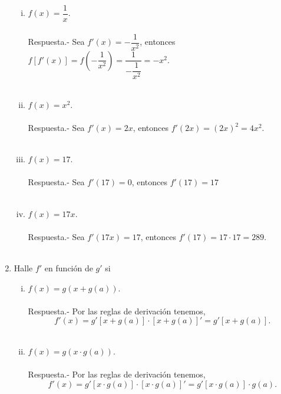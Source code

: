 \begin{enumerate}[\bfseries 1.]
	\begin{enumerate}[(i)]

	    \item $f(x)=\dfrac{1}{x}$.\\\\
		Respuesta.-\; Sea $f'(x)=-\dfrac{1}{x^2}$, entonces
		$f\left[f'(x)\right]=f\left(-\dfrac{1}{x^2}\right)=\dfrac{1}{-\dfrac{1}{x^2}}=-x^2.$\\\\

	    \item $f(x)=x^2$.\\\\
		Respuesta.-\; Sea $f'(x)=2x$, entonces
		$f'\left(2x\right)=(2x)^2=4x^2.$\\\\

	    \item $f(x)=17$.\\\\
		Respuesta.-\; Sea $f'(17)=0$, entonces
		$f'\left(17\right)=17$\\\\

	    \item $f(x)=17x$.\\\\
		Respuesta.-\; Sea $f'(17x)=17$, entonces $f'\left(17\right)=17\cdot 17=289$.\\\\

	\end{enumerate}

    \item Halle $f'$ en función de $g'$ si

	\begin{enumerate}[(i)]

	    \item $f(x)=g(x+g(a))$.\\\\
		Respuesta.-\; Por las reglas de derivación tenemos,
		$$f'(x)=g'\left[x+g(a)\right]\cdot \left[x+g(a)\right]'=g'\left[x+g(a)\right].$$\\

	    \item $f(x)=g(x\cdot g(a))$.\\\\
		Respuesta.-\; Por las reglas de derivación tenemos,
		$$f'(x)=g'\left[x\cdot g(a)\right]\cdot \left[x\cdot g(a)\right]'=g'\left[x\cdot g(a)\right]\cdot g(a).$$\\


\end{enumerate}
\end{enumerate}
